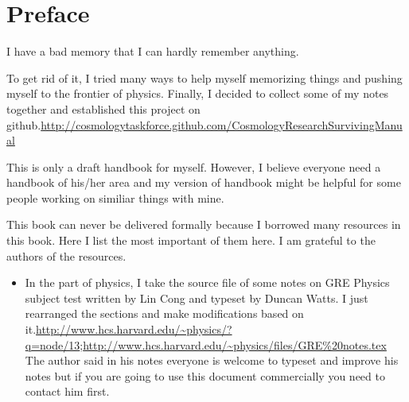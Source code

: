 \chapter{Preface}

I have a bad memory that I can hardly remember anything.

To get rid of it, I tried many ways to help myself memorizing things and pushing myself to the frontier of physics. Finally, I decided to collect some of my notes together and established this project on github.\url{http://cosmologytaskforce.github.com/CosmologyResearchSurvivingManual}

This is only a draft handbook for myself. However, I believe everyone need a handbook of his/her area and my version of handbook might be helpful for some people working on similiar things with mine.

This book can never be delivered formally because I borrowed many resources in this book. Here I list the most important of them here. I am grateful to the authors of the resources.

\begin{itemize}
\item
In the part of physics, I take the source file of some notes on GRE Physics subject test written by Lin Cong and typeset by Duncan Watts. I just rearranged the sections and make modifications based on it.\url{http://www.hcs.harvard.edu/~physics/?q=node/13};\url{http://www.hcs.harvard.edu/~physics/files/GRE\%20notes.tex} 
The author said in his notes everyone is welcome to typeset and improve his notes but if you are going to use this document commercially you need to contact him first.
\end{itemize}
